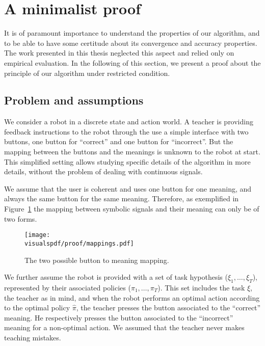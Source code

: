 
\section{A minimalist proof}
\label{chapter:limitations:proof}

It is of paramount importance to understand the properties of our algorithm, and to be able to have some certitude about its convergence and accuracy properties. The work presented in this thesis neglected this aspect and relied only on empirical evaluation. In the following of this section, we present a proof about the principle of our algorithm under restricted condition.


\subsection{Problem and assumptions}

We consider a robot in a discrete state and action world. A teacher is providing feedback instructions to the robot through the use a simple interface with two buttons, one button for ``correct'' and one button for ``incorrect''. But the mapping between the buttons and the meanings is unknown to the robot at start. This simplified setting allows studying specific details of the algorithm in more details, without the problem of dealing with continuous signals.

We assume that the user is coherent and uses one button for one meaning, and always the same button for the same meaning. Therefore, as exemplified in Figure~\ref{fig:proofmapping} the mapping between symbolic signals and their meaning can only be of two forms. 

\begin{figure}[!htbp]
\centering
\texttt{[image: \\visualspdf/proof/mappings.pdf]}
\caption{The two possible button to meaning mapping.}
\label{fig:proofmapping}
\end{figure} 

We further assume the robot is provided with a set of task hypothesis ($\xi_1,\ldots,\xi_T$), represented by their associated policies ($\pi_1, \ldots, \pi_T$). This set includes the task $\hat{\xi}$, the teacher as in mind, and when the robot performs an optimal action according to the optimal policy $\hat{\pi}$, the teacher presses the button associated to the ``correct'' meaning. He respectively presses the button associated to the ``incorrect'' meaning for a non-optimal action. We assumed that the teacher never makes teaching mistakes.

